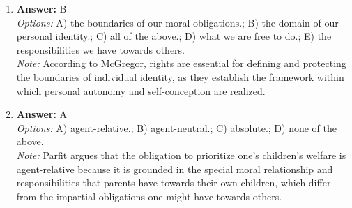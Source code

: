 \documentclass[12pt]{article}
\begin{document}
\begin{enumerate}[label=\arabic*.]
\item \textbf{Answer:} B
\\ \textit{Options:} A) the boundaries of our moral obligations.; B) the domain of our personal identity.; C) all of the above.; D) what we are free to do.; E) the responsibilities we have towards others.
\\ \textit{Note:} According to McGregor, rights are essential for defining and protecting the boundaries of individual identity, as they establish the framework within which personal autonomy and self-conception are realized.
\item \textbf{Answer:} A
\\ \textit{Options:} A) agent-relative.; B) agent-neutral.; C) absolute.; D) none of the above.
\\ \textit{Note:} Parfit argues that the obligation to prioritize one's children's welfare is agent-relative because it is grounded in the special moral relationship and responsibilities that parents have towards their own children, which differ from the impartial obligations one might have towards others.
\end{enumerate}
\end{document}
